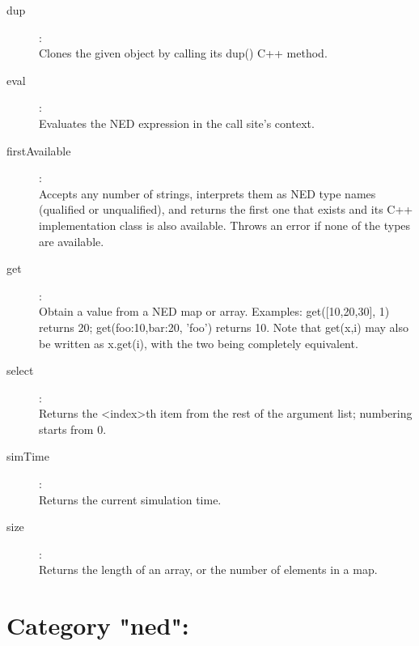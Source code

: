 \begin{description}
\item[dup]:  \\
    Clones the given object by calling its dup() C++ method.

\item[eval]:  \\
    Evaluates the NED expression in the call site's context.

\item[firstAvailable]:  \\
    Accepts any number of strings, interprets them as NED type names (qualified
    or unqualified), and returns the first one that exists and its C++
    implementation class is also available. Throws an error if none of the
    types are available.

\item[get]:  \\
    Obtain a value from a NED map or array. Examples: get([10,20,30], 1)
    returns 20; get({foo:10,bar:20}, 'foo') returns 10. Note that get(x,i) may
    also be written as x.get(i), with the two being completely equivalent.

\item[select]:  \\
    Returns the <index>th item from the rest of the argument list; numbering
    starts from 0.

\item[simTime]:  \\
    Returns the current simulation time.

\item[size]:  \\
    Returns the length of an array, or the number of elements in a map.


\end{description}

\section{Category "ned":}
\label{sec:ned-functions:category-ned}

